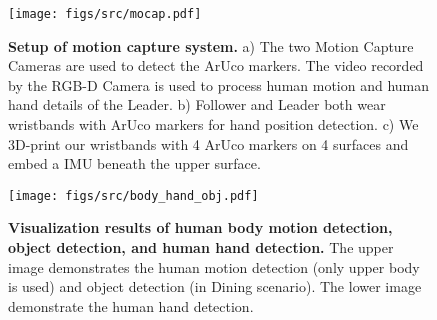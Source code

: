 
\begin{figure}[b]
    \centering
    \texttt{[image: figs/src/mocap.pdf]}
    \caption{\small \textbf{Setup of motion capture system.} a) The two Motion Capture Cameras are used to detect the ArUco markers. The video recorded by the RGB-D Camera is used to process human motion and human hand details of the Leader. b) Follower and Leader both wear wristbands with ArUco markers for hand position detection. c) We 3D-print our wristbands with 4 ArUco markers on 4 surfaces and embed a IMU beneath the upper surface.}
    \label{fig:mocap_sys}
\end{figure}

\begin{figure}
    \centering
    \texttt{[image: figs/src/body\_hand\_obj.pdf]}
    \caption{\small \textbf{Visualization results of human body motion detection, object detection, and human hand detection.} The upper image demonstrates the human motion detection (only upper body is used) and object detection (in Dining scenario). The lower image demonstrate the human hand detection.}
    \label{fig:zed_detect}
\end{figure}